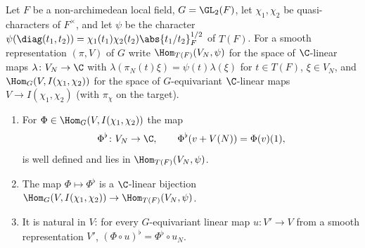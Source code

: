 Let $F$ be a non-archimedean local field, $G=\GL_2(F)$, let $\chi_1,\chi_2$ be quasi-characters of $F^\times$, and let
$\psi$ be the character $\psi(\diag(t_1,t_2))=\chi_1(t_1)\chi_2(t_2)\abs{t_1/t_2}_F^{1/2}$ of $T(F)$. For a smooth
representation $(\pi,V)$ of $G$ write $\Hom_{T(F)}(V_N,\psi)$ for the space of $\C$-linear maps $\lambda\colon V_N\to\C$
with $\lambda(\pi_N(t)\xi)=\psi(t)\lambda(\xi)$ for $t\in T(F)$, $\xi\in V_N$, and $\Hom_G(V,I(\chi_1,\chi_2))$ for the
space of $G$-equivariant $\C$-linear maps $V\to I(\chi_1,\chi_2)$ (with $\pi_\chi$ on the target).
\begin{enumerate}[label=(\alph*)]
\item For $\Phi\in\Hom_G(V,I(\chi_1,\chi_2))$ the map
  \[
    \Phi^\flat\colon V_N\to\C,\qquad\Phi^\flat(v+V(N))=\Phi(v)(1),
  \]
  is well defined and lies in $\Hom_{T(F)}(V_N,\psi)$.
\item The map $\Phi\mapsto\Phi^\flat$ is a $\C$-linear bijection
  $\Hom_G(V,I(\chi_1,\chi_2))\to\Hom_{T(F)}(V_N,\psi)$.
\item It is natural in $V$: for every $G$-equivariant linear map $u\colon V'\to V$ from a smooth representation $V'$,
  $(\Phi\circ u)^\flat=\Phi^\flat\circ u_N$.
\end{enumerate}

